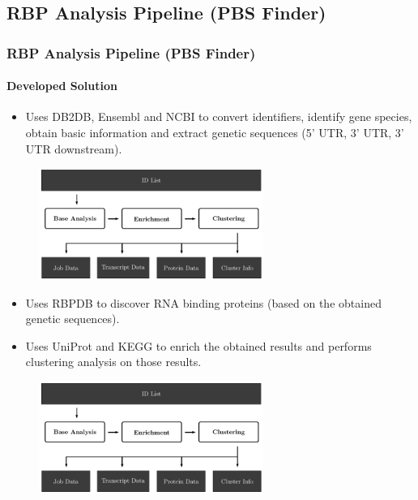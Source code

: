 \documentclass[xcolor=dvipsnames]{beamer}
\begin{document}
\subsection{RBP Analysis Pipeline (PBS Finder)}
\begin{frame}[allowframebreaks]
  \frametitle{RBP Analysis Pipeline (PBS Finder)}
  \framesubtitle{Developed Solution}

\begin{itemize}
\item
Uses DB2DB, Ensembl and NCBI to convert identifiers, identify gene species,
obtain basic information and extract genetic sequences (5' UTR, 3' UTR, 3' UTR
downstream).
\end{itemize}\vspace{0.23cm}

\begin{figure}
  \centering
  \includegraphics[width=0.65\textwidth]{workflow2}
\end{figure}

\framebreak

\begin{itemize}
\item
Uses RBPDB to discover RNA binding proteins (based on the obtained genetic
sequences).

\item
Uses UniProt and KEGG to enrich the obtained results and performs clustering
analysis on those results.
\end{itemize}

\begin{figure}
  \centering
  \includegraphics[width=0.65\textwidth]{workflow2}
\end{figure}


\end{frame}
\end{document}
